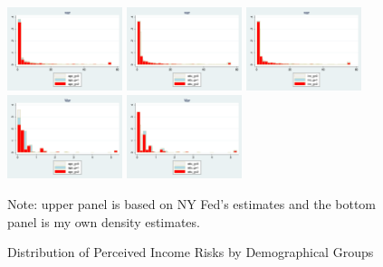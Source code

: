 \documentclass[]{article}
\begin{document}
\begin{figure}[ht]
	
	\centering
	\caption{Distribution of Perceived Income Risks by Demographical Groups}
	\label{SCEPopHist_byGroup}
	\includegraphics[width=0.3\textwidth]{figures/hist_var_age_g.png} 
	\includegraphics[width=0.3\textwidth]{figures/hist_var_edu_g.png} 
	\includegraphics[width=0.3\textwidth]{figures/hist_var_inc_g.png}\\
		\includegraphics[width=0.3\textwidth]{figures/hist_Inc_Var_age_g.png} 
	\includegraphics[width=0.3\textwidth]{figures/hist_Inc_Var_edu_g.png} 
	\begin{flushleft}
		{\footnotesize Note: upper panel is based on NY Fed's estimates and the bottom panel is my own density estimates. }
	\end{flushleft}
	
\end{figure}
\end{document}
